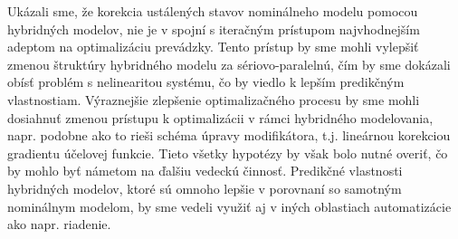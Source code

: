 Ukázali sme, že korekcia ustálených stavov nominálneho modelu pomocou hybridných modelov, nie je v spojní s iteračným prístupom najvhodnejším adeptom na optimalizáciu prevádzky. Tento prístup by sme mohli vylepšiť zmenou štruktúry hybridného modelu za sériovo-paralelnú, čím by sme dokázali obísť problém s nelinearitou systému, čo by viedlo k lepším predikčným vlastnostiam. Výraznejšie zlepšenie optimalizačného procesu by sme mohli dosiahnuť zmenou prístupu k optimalizácii v rámci hybridného modelovania, napr. podobne ako to rieši schéma úpravy modifikátora, t.j. lineárnou korekciou gradientu účelovej funkcie. Tieto všetky hypotézy by však bolo nutné overiť, čo by mohlo byť námetom na ďalšiu vedeckú činnosť. Predikčné vlastnosti hybridných modelov, ktoré sú omnoho lepšie v porovnaní so samotným nominálnym modelom, by sme vedeli využiť aj v iných oblastiach automatizácie ako napr. riadenie. 